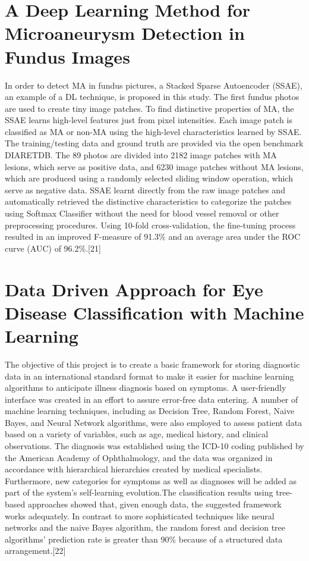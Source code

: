 \section{A Deep Learning Method for Microaneurysm Detection in Fundus Images}
In order to detect MA in fundus pictures, a Stacked Sparse Autoencoder (SSAE), an example of a DL technique, is proposed in this study. The first fundus photos are used to create tiny image patches. To find distinctive properties of MA, the SSAE learns high-level features just from pixel intensities. Each image patch is classified as MA or non-MA using the high-level characteristics learned by SSAE. The training/testing data and ground truth are provided via the open benchmark DIARETDB. The 89 photos are divided into 2182 image patches with MA lesions, which serve as positive data, and 6230 image patches without MA lesions, which are produced using a randomly selected sliding window operation, which serve as negative data. SSAE learnt directly from the raw image patches and automatically retrieved the distinctive characteristics to categorize the patches using Softmax Classifier without the need for blood vessel removal or other preprocessing procedures. Using 10-fold cross-validation, the fine-tuning process resulted in an improved F-measure of 91.3\% and an average area under the ROC curve (AUC) of 96.2\%.[21]
\section{Data Driven Approach for Eye Disease Classification with Machine Learning}
The objective of this project is to create a basic framework for storing diagnostic data in an international standard format to make it easier for machine learning algorithms to anticipate illness diagnosis based on symptoms. A user-friendly interface was created in an effort to assure error-free data entering. A number of machine learning techniques, including as Decision Tree, Random Forest, Naive Bayes, and Neural Network algorithms, were also employed to assess patient data based on a variety of variables, such as age, medical history, and clinical observations. The diagnosis was established using the ICD-10 coding published by the American Academy of Ophthalmology, and the data was organized in accordance with hierarchical hierarchies created by medical specialists. Furthermore, new categories for symptoms as well as diagnoses will be added as part of the system's self-learning evolution.The classification results using tree-based approaches showed that, given enough data, the suggested framework works adequately. In contrast to more sophisticated techniques like neural networks and the naive Bayes algorithm, the random forest and decision tree algorithms' prediction rate is greater than 90\% because of a structured data arrangement.[22]